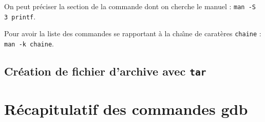 On peut pr\'eciser la section de la commande dont on cherche le manuel
: \verb?man -S 3 printf?.


Pour avoir la liste des commandes se rapportant \`a la cha\^\i{}ne de
carat\`eres \texttt{chaine} : \verb?man -k chaine?.

\subsection{Cr\'eation de fichier d'archive avec \texttt{tar}}
\label{sec:tar}
\section{R\'ecapitulatif des commandes gdb}
\label{sec:gdb}





